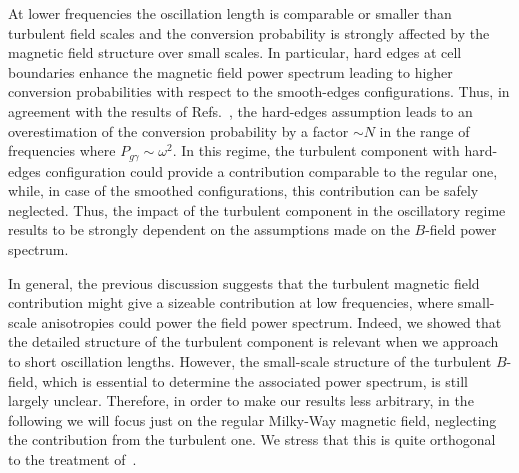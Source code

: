 \documentclass[twocolumn,superscriptaddress,floatfix,preprintnumbers, nofootinbib,hyperref]{revtex4-2}
\begin{document}
At lower frequencies the oscillation length is comparable or smaller than turbulent field scales and the conversion probability is strongly affected by the magnetic field structure over small scales. In particular, hard edges at cell boundaries enhance the magnetic field power spectrum leading to higher conversion probabilities with respect to the smooth-edges configurations. Thus, in agreement with the results of Refs.~\cite{Kartavtsev:2016doq,Ito:2023nkq}, the hard-edges assumption leads to an overestimation of the conversion probability by a factor $\sim N$ in the range of frequencies where $P_{g\gamma}\sim\omega^{2}$. In this regime, the turbulent component with hard-edges configuration could provide a contribution comparable to the regular one, while, in case of the smoothed configurations, this contribution can be safely neglected. Thus, the impact of the turbulent component in the oscillatory regime results to be strongly dependent on the assumptions made on the $B$-field power spectrum.


In general, the previous discussion suggests that the turbulent magnetic field contribution might give a sizeable contribution at low frequencies, where small-scale anisotropies could power the field power spectrum. Indeed, we showed that the detailed structure of the turbulent component is relevant when we approach to short oscillation lengths. However, the small-scale structure of the turbulent $B$-field, which is essential to determine the associated power spectrum, is still largely unclear. Therefore, in order to make our results less arbitrary,
in the following we will focus just on the regular Milky-Way magnetic field, neglecting the contribution from the turbulent one. We stress that this is quite orthogonal to the treatment of~\cite{Ito:2023nkq}.
\end{document}
